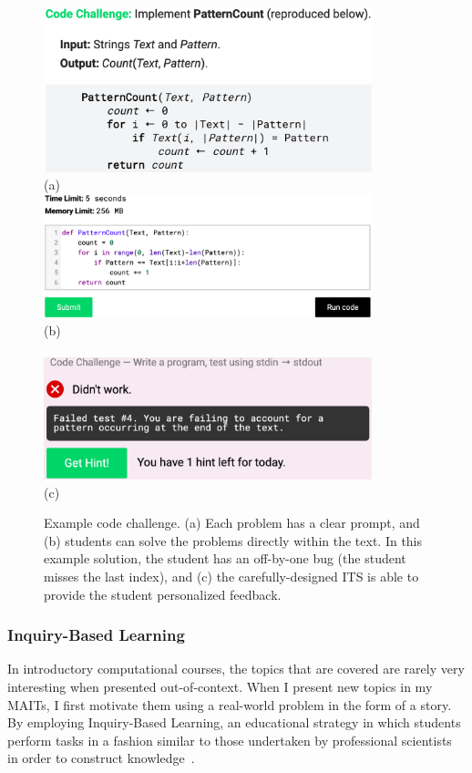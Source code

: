 \begin{figure}
\centering
\includegraphics[width=0.85\textwidth]{figs/education-code-challenge-prompt}\\
(a)\\
\includegraphics[width=0.85\textwidth]{figs/education-code-challenge-bug}\\
(b)\\~\\
\includegraphics[width=0.85\textwidth]{figs/education-code-challenge-feedback}\\
(c)\\
\caption[Example Code Challenge]
{Example code challenge. (a) Each problem has a clear prompt, and (b) students can solve the problems directly within the text. In this example solution, the student has an off-by-one bug (the student misses the last index), and (c) the carefully-designed \gls{ITS} is able to provide the student personalized feedback.}
\label{fig:education-code-challenge}
\end{figure}

\subsubsection{Inquiry-Based Learning}
In introductory computational courses, the topics that are covered are rarely very interesting when presented out-of-context. When I present new topics in my \glspl{MAIT}, I first motivate them using a real-world problem in the form of a story. By employing Inquiry-Based Learning, an educational strategy in which students perform tasks in a fashion similar to those undertaken by professional scientists in order to construct knowledge~\cite{Pedaste2015}.

